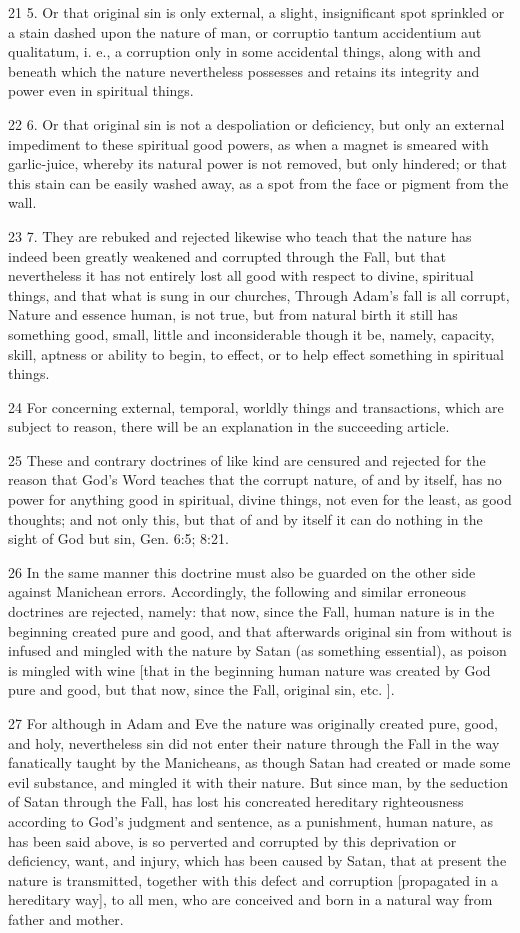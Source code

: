 21 5. Or that original sin is only external, a slight, insignificant spot sprinkled or a stain dashed upon the nature of man, or corruptio tantum accidentium aut qualitatum, i. e., a corruption only in some accidental things, along with and beneath which the nature nevertheless possesses and retains its integrity and power even in spiritual things.

22 6. Or that original sin is not a despoliation or deficiency, but only an external impediment to these spiritual good powers, as when a magnet is smeared with garlic-juice, whereby its natural power is not removed, but only hindered; or that this stain can be easily washed away, as a spot from the face or pigment from the wall.

23 7. They are rebuked and rejected likewise who teach that the nature has indeed been greatly weakened and corrupted through the Fall, but that nevertheless it has not entirely lost all good with respect to divine, spiritual things, and that what is sung in our churches, Through Adam’s fall is all corrupt, Nature and essence human, is not true, but from natural birth it still has something good, small, little and inconsiderable though it be, namely, capacity, skill, aptness or ability to begin, to effect, or to help effect something in spiritual things.

24 For concerning external, temporal, worldly things and transactions, which are subject to reason, there will be an explanation in the succeeding article.

25 These and contrary doctrines of like kind are censured and rejected for the reason that God’s Word teaches that the corrupt nature, of and by itself, has no power for anything good in spiritual, divine things, not even for the least, as good thoughts; and not only this, but that of and by itself it can do nothing in the sight of God but sin, Gen. 6:5; 8:21.

26 In the same manner this doctrine must also be guarded on the other side against Manichean errors. Accordingly, the following and similar erroneous doctrines are rejected, namely: that now, since the Fall, human nature is in the beginning created pure and good, and that afterwards original sin from without is infused and mingled with the nature by Satan (as something essential), as poison is mingled with wine [that in the beginning human nature was created by God pure and good, but that now, since the Fall, original sin, etc. ].

27 For although in Adam and Eve the nature was originally created pure, good, and holy, nevertheless sin did not enter their nature through the Fall in the way fanatically taught by the Manicheans, as though Satan had created or made some evil substance, and mingled it with their nature. But since man, by the seduction of Satan through the Fall, has lost his concreated hereditary righteousness according to God’s judgment and sentence, as a punishment, human nature, as has been said above, is so perverted and corrupted by this deprivation or deficiency, want, and injury, which has been caused by Satan, that at present the nature is transmitted, together with this defect and corruption [propagated in a hereditary way], to all men, who are conceived and born in a natural way from father and mother.

